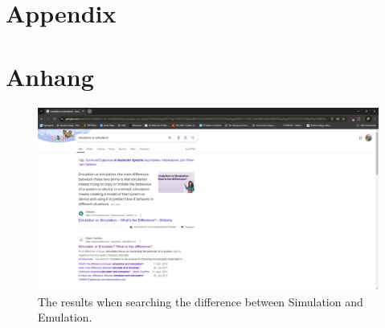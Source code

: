
{\chapter{Appendix}}    %
{\chapter{Anhang}}      %
		
\setcounter{figure}{0}
		
\begin{figure} [ht]
  \centering
  \includegraphics[width=\textwidth]{images/StackOverflow}
  \caption{The results when searching the difference between Simulation and Emulation.}
  \label{fig:Google_SO}
\end{figure}